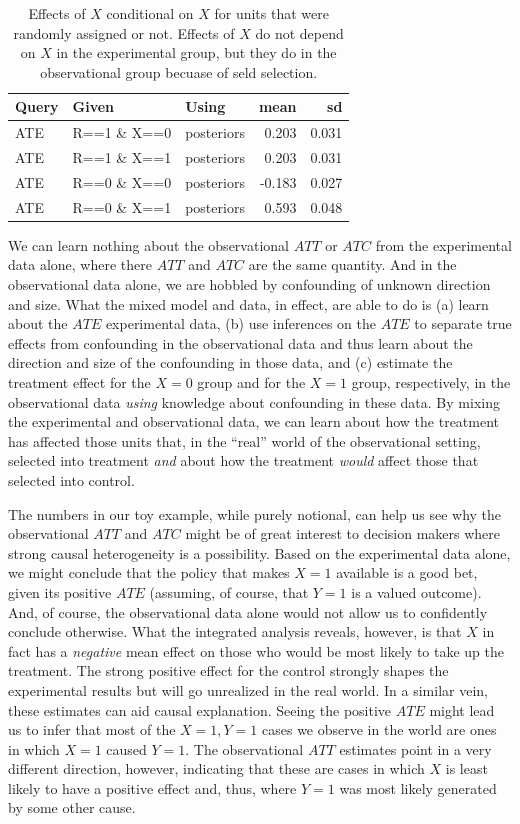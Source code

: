 \documentclass[
  12pt,
]{book}
\begin{document}
\begin{table}

\caption{\label{tab:combexpobsattatc}Effects of $X$ conditional on $X$ for units that were randomly assigned or not.  Effects of $X$ do not depend on $X$ in the experimental group, but they do in the observational group becuase of seld selection. }
\centering
\begin{tabular}[t]{l|l|l|r|r}
\hline
Query & Given & Using & mean & sd\\
\hline
ATE & R==1 \& X==0 & posteriors & 0.203 & 0.031\\
\hline
ATE & R==1 \& X==1 & posteriors & 0.203 & 0.031\\
\hline
ATE & R==0 \& X==0 & posteriors & -0.183 & 0.027\\
\hline
ATE & R==0 \& X==1 & posteriors & 0.593 & 0.048\\
\hline
\end{tabular}
\end{table}

We can learn nothing about the observational \(ATT\) or \(ATC\) from the experimental data alone, where there \(ATT\) and \(ATC\) are the same quantity. And in the observational data alone, we are hobbled by confounding of unknown direction and size. What the mixed model and data, in effect, are able to do is (a) learn about the \(ATE\) experimental data, (b) use inferences on the \(ATE\) to separate true effects from confounding in the observational data and thus learn about the direction and size of the confounding in those data, and (c) estimate the treatment effect for the \(X=0\) group and for the \(X=1\) group, respectively, in the observational data \emph{using} knowledge about confounding in these data. By mixing the experimental and observational data, we can learn about how the treatment has affected those units that, in the ``real'' world of the observational setting, selected into treatment \emph{and} about how the treatment \emph{would} affect those that selected into control.

The numbers in our toy example, while purely notional, can help us see why the observational \(ATT\) and \(ATC\) might be of great interest to decision makers where strong causal heterogeneity is a possibility. Based on the experimental data alone, we might conclude that the policy that makes \(X=1\) available is a good bet, given its positive \(ATE\) (assuming, of course, that \(Y=1\) is a valued outcome). And, of course, the observational data alone would not allow us to confidently conclude otherwise. What the integrated analysis reveals, however, is that \(X\) in fact has a \emph{negative} mean effect on those who would be most likely to take up the treatment. The strong positive effect for the control strongly shapes the experimental results but will go unrealized in the real world.
In a similar vein, these estimates can aid causal explanation. Seeing the positive \(ATE\) might lead us to infer that most of the \(X=1, Y=1\) cases we observe in the world are ones in which \(X=1\) caused \(Y=1\). The observational \(ATT\) estimates point in a very different direction, however, indicating that these are cases in which \(X\) is least likely to have a positive effect and, thus, where \(Y=1\) was most likely generated by some other cause.
\end{document}
